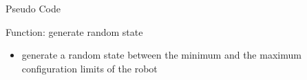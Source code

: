 \documentclass[%
  professionalfonts,%
  xcolor={%
    usenames,%
    dvipsnames,%
    svgnames,%
    table,%
    hyperref%
  }%
]{beamer}
\begin{document}
      \begin{frame}{Pseudo Code}
        
      \end{frame}
      
      
      \begin{frame}{Function: generate random state}
        \begin{itemize}
          \item generate a random state between the minimum and the maximum configuration limits of the robot
        \end{itemize}
        
      \end{frame}



\end{document}
